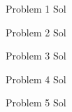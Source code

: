 \documentclass[10pt]{../usamts}
\begin{document}
\begin{solution}{1}
Problem 1 Sol
\end{solution}

\begin{solution}{2}
Problem 2 Sol
\end{solution}

\begin{solution}{3}
Problem 3 Sol
\end{solution}

\begin{solution}{4}
Problem 4 Sol
\end{solution}

\begin{solution}{5}
Problem 5 Sol
\end{solution}
\end{document}
